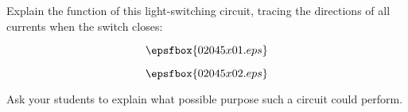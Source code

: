 

Explain the function of this light-switching circuit, tracing the directions of all currents when the switch closes:

$$\epsfbox{02045x01.eps}$$







$$\epsfbox{02045x02.eps}$$







Ask your students to explain what possible purpose such a circuit could perform.




